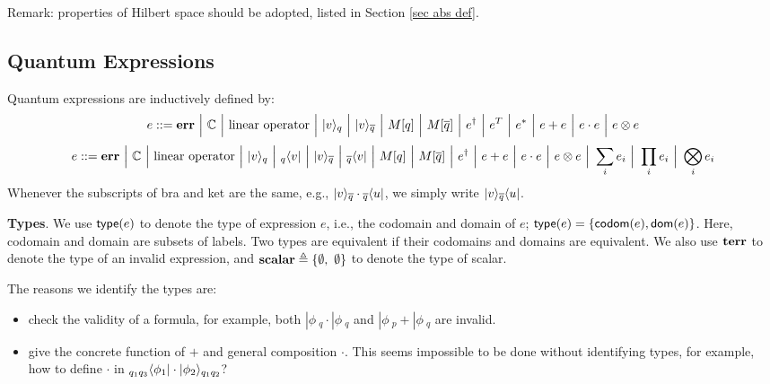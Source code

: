     Remark: properties of Hilbert space should be adopted, listed in Section \ref{sec abs def}.
    
    \subsection{Quantum Expressions}
    \label{sec qexpr}
    \begin{definition}
        Quantum expressions are inductively defined by:
        $$e ::= \qerr\ \Big|\ \complexnumber\ \Big|\ \textrm{linear operator}\ \Big|\ |v\>_q\ \Big|\ |v\>_{\qbar}\ \Big|\ M[q]\ \Big|\ M[\qbar]\ \Big|\ e^\dag\ \Big|\ e^T\ \Big|\ e^\ast\ \Big|\ e + e\ \Big|\ e \cdot e\ \Big|\ e\otimes e$$
        $$e ::= \qerr\ \Big|\ \complexnumber\ \Big|\ \textrm{linear operator}\ \Big|\ |v\>_q\ \Big|\ {}_q\<v|\ \Big|\ |v\>_{\qbar}\ \Big|\ {}_{\qbar}\<v|\ \Big|\ M[q]\ \Big|\ M[\qbar]\ \Big|\ e^\dag\ \Big|\ e + e\ \Big|\ e \cdot e\ \Big|\ e\otimes e\ \Big|\ \sum_i e_i\ \Big|\ \prod_i e_i\ \Big|\ \bigotimes_i e_i$$
        Whenever the subscripts of bra and ket are the same, e.g., $|v\rangle_{\overline{q}} \cdot {}_{\overline{q}}\langle u|$, we simply write $|v\rangle_{\overline{q}}\langle u|$.
    \end{definition} 
    
    \noindent\textbf{Types}. 
    We use ${\textsf{type}}(e)$ to denote the type of expression $e$, i.e., the codomain and domain of $e$; ${\textsf{type}}(e) = \{{\mathsf{codom}\!\left(e\right)}, {\mathsf{dom}\!\left(e\right)}\}$. Here, codomain and domain are subsets of labels.
    Two types are equivalent if their codomains and domains are equivalent. We also use ${\mathbf{terr}}$ to denote the type of an invalid expression, and $\textbf{scalar}\triangleq\{\emptyset,\ \emptyset\}$ to denote the type of scalar.
    
    The reasons we identify the types are:
    \begin{itemize}
        \item[] check the validity of a formula, for example, both $|\phi\>_q\cdot|\phi\>_q$ and $|\phi\>_p + |\phi\>_q$ are invalid.
        \item[] give the concrete function of $+$ and general composition $\cdot$. This seems impossible to be done without identifying types, for example, how to define $\cdot$ in ${}_{q_1q_3}\langle\phi_1|\cdot|\phi_2\rangle_{q_1q_2}$?
    \end{itemize}
    

